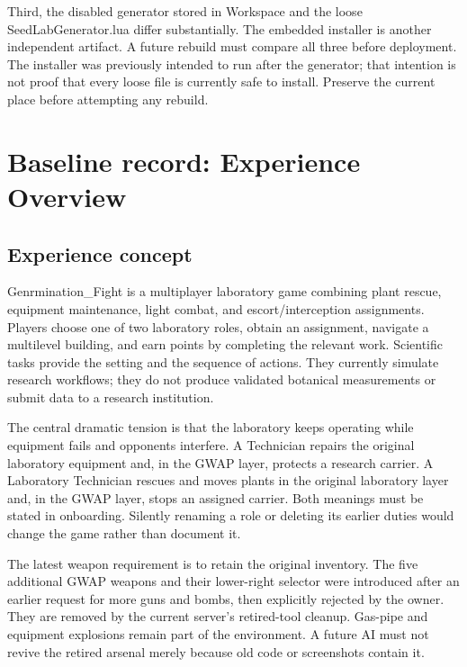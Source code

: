 Third, the disabled generator stored in Workspace and the loose SeedLabGenerator.\allowbreak{}lua differ substantially.\allowbreak{} The embedded installer is another independent artifact.\allowbreak{} A future rebuild must compare all three before deployment.\allowbreak{} The installer was previously intended to run after the generator; that intention is not proof that every loose file is currently safe to install.\allowbreak{} Preserve the current place before attempting any rebuild.\allowbreak{}

\chapter{Baseline record: Experience Overview}
\section{Experience concept}
Genrmination\_\allowbreak{}Fight is a multiplayer laboratory game combining plant rescue, equipment maintenance, light combat, and escort/\allowbreak{}interception assignments.\allowbreak{} Players choose one of two laboratory roles, obtain an assignment, navigate a multilevel building, and earn points by completing the relevant work.\allowbreak{} Scientific tasks provide the setting and the sequence of actions.\allowbreak{} They currently simulate research workflows; they do not produce validated botanical measurements or submit data to a research institution.\allowbreak{}

The central dramatic tension is that the laboratory keeps operating while equipment fails and opponents interfere.\allowbreak{} A Technician repairs the original laboratory equipment and, in the GWAP layer, protects a research carrier.\allowbreak{} A Laboratory Technician rescues and moves plants in the original laboratory layer and, in the GWAP layer, stops an assigned carrier.\allowbreak{} Both meanings must be stated in onboarding.\allowbreak{} Silently renaming a role or deleting its earlier duties would change the game rather than document it.\allowbreak{}

The latest weapon requirement is to retain the original inventory.\allowbreak{} The five additional GWAP weapons and their lower-right selector were introduced after an earlier request for more guns and bombs, then explicitly rejected by the owner.\allowbreak{} They are removed by the current server's retired-tool cleanup.\allowbreak{} Gas-pipe and equipment explosions remain part of the environment.\allowbreak{} A future AI must not revive the retired arsenal merely because old code or screenshots contain it.\allowbreak{}

